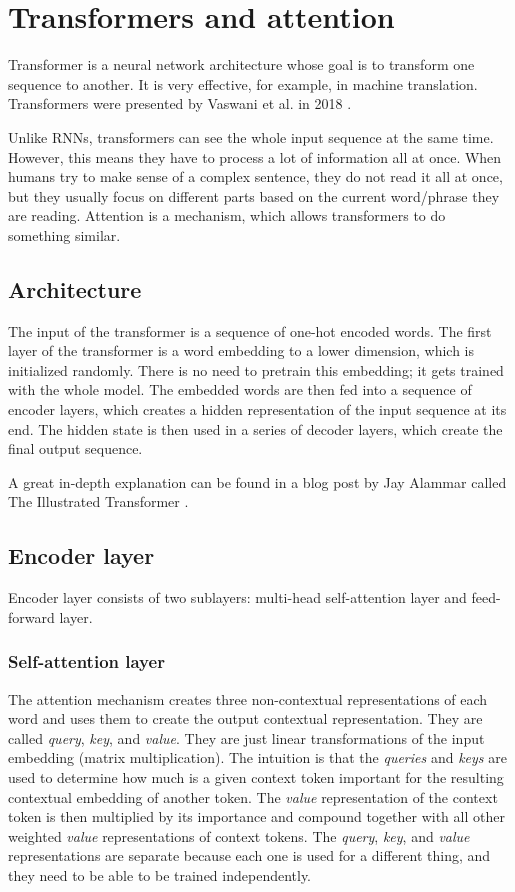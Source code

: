 \documentclass[
  printed, %
  color,   %
  table,   %
  oneside, %
  lof,     %
  lot,     %
]{fithesis3}
\begin{document}
\section{Transformers and attention}
\label{sec:transformer}
Transformer is a neural network architecture whose goal is to transform one sequence to another. It is very effective, for example, in machine translation. Transformers were presented by Vaswani et al. in 2018 \cite{attentionisall}.

Unlike RNNs, transformers can see the whole input sequence at the same time. However, this means they have to process a lot of information all at once. When humans try to make sense of a complex sentence, they do not read it all at once, but they usually focus on different parts based on the current word/phrase they are reading. Attention is a mechanism, which allows transformers to do something similar.

\subsection{Architecture}

The input of the transformer is a sequence of one-hot encoded words. The first layer of the transformer is a word embedding to a lower dimension, which is initialized randomly. There is no need to pretrain this embedding; it gets trained with the whole model. 
The embedded words are then fed into a sequence of encoder layers, which creates a hidden representation of the input sequence at its end. The hidden state is then used in a series of decoder layers, which create the final output sequence.

A great in-depth explanation can be found in a blog post by Jay Alammar called The Illustrated Transformer  \parencite{ilustrtran}.

\subsection{Encoder layer}
\label{sec:encoder}
Encoder layer consists of two sublayers: multi-head self-attention layer and feed-forward layer.

\subsubsection{Self-attention layer}

The attention mechanism creates three non-contextual representations of each word and uses them to create the output contextual representation. They are called \textit{query}, \textit{key}, and \textit{value}. They are just linear transformations of the input embedding (matrix multiplication). The intuition is that the \textit{queries} and \textit{keys} are used to determine how much is a given context token important for the resulting contextual embedding of another token. The \textit{value} representation of the context token is then multiplied by its importance and compound together with all other weighted \textit{value} representations of context tokens. The \textit{query}, \textit{key}, and \textit{value} representations are separate because each one is used for a different thing, and they need to be able to be trained independently. 
\end{document}

